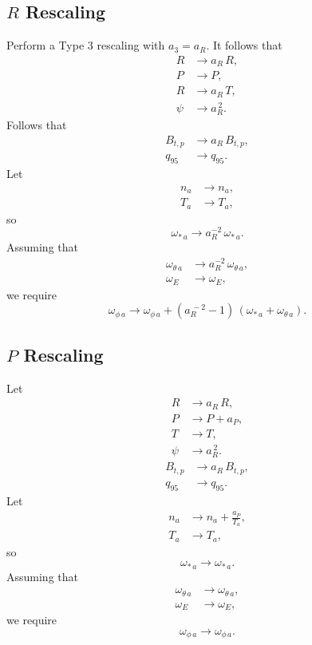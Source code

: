 \documentclass[12pt]{article}
\begin{document}
\subsection{$R$ Rescaling}
Perform a Type 3 rescaling with $a_3=a_R$.
It follows that
\begin{align}
R&\rightarrow a_R\,R,\\[0.5ex]
P&\rightarrow P,\\[0.5ex]
R&\rightarrow a_R\,T,\\[0.5ex]
\psi&\rightarrow a_R^{\,2}.
\end{align}
Follows that
\begin{align}
B_{t,p} &\rightarrow a_R\,B_{t,p},\\[0.5ex]
q_{95}&\rightarrow q_{95}.
\end{align}
 Let
\begin{align}
n_a&\rightarrow n_a,\\[0.5ex]
T_a&\rightarrow T_a,
\end{align}
so
\begin{equation}
\omega_{\ast\,a} \rightarrow a_R^{-2}\,\omega_{\ast\,a}.
\end{equation}
Assuming that
\begin{align}
\omega_{\theta\,a}&\rightarrow a_R^{-2}\,\omega_{\theta\,a},\\[0.5ex]
\omega_E &\rightarrow \omega_E,
\end{align}
we require
\begin{equation}
\omega_{\phi\,a}\rightarrow \omega_{\phi\,a} + (a_R^{\,-2}-1)\,(\omega_{\ast\,a}+\omega_{\theta\,a}).
\end{equation}

\subsection{$P$ Rescaling}
Let 
\begin{align}
R&\rightarrow a_R\,R,\\[0.5ex]
P&\rightarrow P + a_P,\\[0.5ex]
T&\rightarrow T,\\[0.5ex]
\psi&\rightarrow a_R^{\,2}.
\end{align}
\begin{align}
B_{t,p} &\rightarrow a_R\,B_{t,p},\\[0.5ex]
q_{95}&\rightarrow q_{95}.
\end{align}
Let
\begin{align}
n_a&\rightarrow n_a +\frac{a_P}{T_a},\\[0.5ex]
T_a&\rightarrow T_a,
\end{align}
so
\begin{equation}
\omega_{\ast\,a} \rightarrow \omega_{\ast\,a}.
\end{equation}
Assuming that
\begin{align}
\omega_{\theta\,a}&\rightarrow\omega_{\theta\,a},\\[0.5ex]
\omega_E &\rightarrow \omega_E,
\end{align}
we require
\begin{equation}
\omega_{\phi\,a}\rightarrow \omega_{\phi\,a}.
\end{equation}
\end{document}
